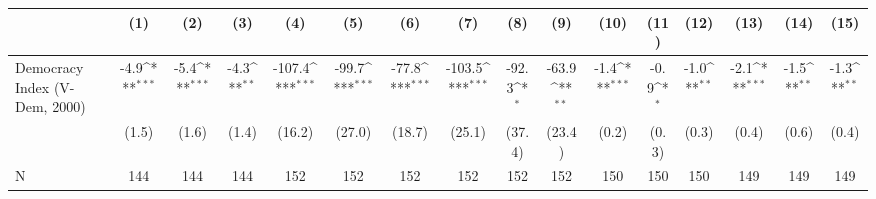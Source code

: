 {
\def\sym#1{\ifmmode^{#1}\else\(^{#1}\)\fi}
\begin{tabular}{l*{15}{c}}
\hline\hline
                    &\multicolumn{1}{c}{(1)}         &\multicolumn{1}{c}{(2)}         &\multicolumn{1}{c}{(3)}         &\multicolumn{1}{c}{(4)}         &\multicolumn{1}{c}{(5)}         &\multicolumn{1}{c}{(6)}         &\multicolumn{1}{c}{(7)}         &\multicolumn{1}{c}{(8)}         &\multicolumn{1}{c}{(9)}         &\multicolumn{1}{c}{(10)}         &\multicolumn{1}{c}{(11)}         &\multicolumn{1}{c}{(12)}         &\multicolumn{1}{c}{(13)}         &\multicolumn{1}{c}{(14)}         &\multicolumn{1}{c}{(15)}         \\
\hline
Democracy Index (V-Dem, 2000)&        -4.9\sym{***}&        -5.4\sym{***}&        -4.3\sym{**} &      -107.4\sym{***}&       -99.7\sym{***}&       -77.8\sym{***}&      -103.5\sym{***}&       -92.3\sym{*}  &       -63.9\sym{**} &        -1.4\sym{***}&        -0.9\sym{*}  &        -1.0\sym{**} &        -2.1\sym{***}&        -1.5\sym{**} &        -1.3\sym{**} \\
                    &       (1.5)         &       (1.6)         &       (1.4)         &      (16.2)         &      (27.0)         &      (18.7)         &      (25.1)         &      (37.4)         &      (23.4)         &       (0.2)         &       (0.3)         &       (0.3)         &       (0.4)         &       (0.6)         &       (0.4)         \\
\hline
N                   &         144         &         144         &         144         &         152         &         152         &         152         &         152         &         152         &         152         &         150         &         150         &         150         &         149         &         149         &         149         \\
\hline\hline
\end{tabular}
}
